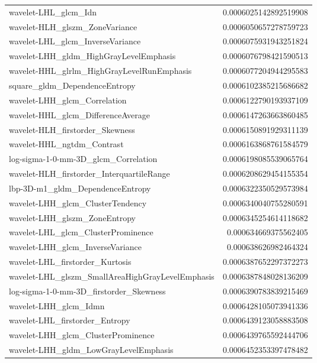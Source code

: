 {\begin{xltabular}[H]{\textwidth}{X r}
        wavelet-LHL\_glcm\_Idn & 0.0006025142892519908 \\
        wavelet-HLH\_glszm\_ZoneVariance & 0.0006050657278759723 \\
        wavelet-LHL\_glcm\_InverseVariance & 0.0006075931943251824 \\
        wavelet-LHH\_gldm\_HighGrayLevelEmphasis & 0.0006076798421590513 \\
        wavelet-HHL\_glrlm\_HighGrayLevelRunEmphasis & 0.0006077204944295583 \\
        square\_gldm\_DependenceEntropy & 0.0006102385215686682 \\
        wavelet-LHH\_glcm\_Correlation & 0.0006122790193937109 \\
        wavelet-HHL\_glcm\_DifferenceAverage & 0.0006147263663860485 \\
        wavelet-HLH\_firstorder\_Skewness & 0.0006150891929311139 \\
        wavelet-HHL\_ngtdm\_Contrast & 0.0006163868761584579 \\
        log-sigma-1-0-mm-3D\_glcm\_Correlation & 0.0006198085539065764 \\
        wavelet-HLH\_firstorder\_InterquartileRange & 0.0006208629454155354 \\
        lbp-3D-m1\_gldm\_DependenceEntropy & 0.0006322350529573984 \\
        wavelet-LHH\_glcm\_ClusterTendency & 0.0006340040755280591 \\
        wavelet-LHH\_glszm\_ZoneEntropy & 0.0006345254614118682 \\
        wavelet-LHL\_glcm\_ClusterProminence & 0.000634669375562405 \\
        wavelet-LHH\_glcm\_InverseVariance & 0.000638626982464324 \\
        wavelet-LHL\_firstorder\_Kurtosis & 0.0006387652297372273 \\
        wavelet-LHL\_glszm\_SmallAreaHighGrayLevelEmphasis & 0.0006387848028136209 \\
        log-sigma-1-0-mm-3D\_firstorder\_Skewness & 0.0006390783839215469 \\
        wavelet-LHH\_glcm\_Idmn & 0.0006428105073941336 \\
        wavelet-LHL\_firstorder\_Entropy & 0.0006439123058883508 \\
        wavelet-LHH\_glcm\_ClusterProminence & 0.0006439765592444706 \\
        wavelet-LHH\_gldm\_LowGrayLevelEmphasis & 0.0006452353397478482 \\

\end{xltabular}}
